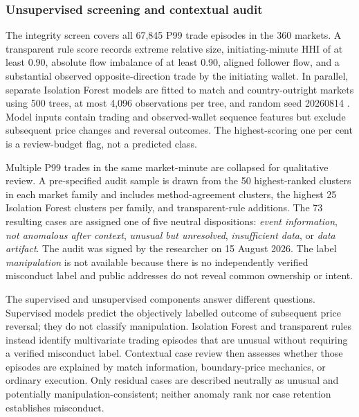 \subsubsection{Unsupervised screening and contextual audit}

The integrity screen covers all 67,845 P99 trade episodes in the 360 markets.
A transparent rule score records extreme relative size, initiating-minute HHI
of at least 0.90, absolute flow imbalance of at least 0.90, aligned follower
flow, and a substantial observed opposite-direction trade by the initiating
wallet. In parallel, separate Isolation Forest models are fitted to match and
country-outright markets using 500 trees, at most 4,096 observations per tree,
and random seed 20260814 \citep{liu2008isolationforest}. Model inputs contain trading and observed-wallet
sequence features but exclude subsequent price changes and reversal outcomes.
The highest-scoring one per cent is a review-budget flag, not a predicted class.

Multiple P99 trades in the same market-minute are collapsed for qualitative
review. A pre-specified audit sample is drawn from the 50 highest-ranked clusters
in each market family and includes method-agreement clusters, the highest 25
Isolation Forest clusters per family, and transparent-rule additions. The 73
resulting cases are assigned one of five neutral dispositions:
\emph{event information}, \emph{not anomalous after context}, \emph{unusual but
unresolved}, \emph{insufficient data}, or \emph{data artifact}. The audit was
signed by the researcher on 15 August 2026. The label \emph{manipulation} is not
available because there is no independently verified misconduct label and
public addresses do not reveal common ownership or intent.

The supervised and unsupervised components answer different questions.
Supervised models predict the objectively labelled outcome of subsequent price
reversal; they do not classify manipulation. Isolation Forest and transparent
rules instead identify multivariate trading episodes that are unusual without
requiring a verified misconduct label. Contextual case review then assesses
whether those episodes are explained by match information, boundary-price
mechanics, or ordinary execution. Only residual cases are described neutrally
as unusual and potentially manipulation-consistent; neither anomaly rank nor
case retention establishes misconduct.
